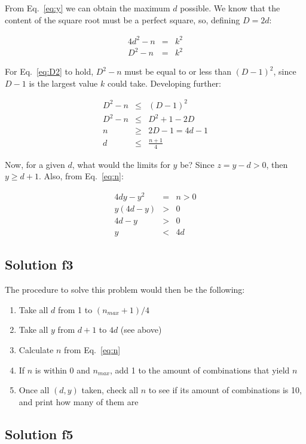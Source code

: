 \documentclass[english]{article}
\begin{document}
From Eq.~\ref{eq:y} we can obtain the maximum $d$ possible. We know that the content of the square root must be a perfect square, so, defining $D = 2d$:

\begin{eqnarray}
4d^2 - n & = & k^2 \\
D^2 - n & = & k^2 \label{eq:D2}
\end{eqnarray}

For Eq.~\ref{eq:D2} to hold, $D^2 - n$ must be equal to or less than $(D-1)^2$, since $D-1$ is the largest value $k$ could take. Developing further:

\begin{eqnarray}
D^2 - n & \leq & (D-1)^2 \\
D^2 - n & \leq & D^2 + 1 -2D \\
n & \geq & 2D-1 = 4d-1 \\
d & \leq & \frac{n+1}{4}
\end{eqnarray}

Now, for a given $d$, what would the limits for $y$ be? Since $z = y-d > 0$, then $y \geq d + 1$. Also, from Eq.~\ref{eq:n}:

\begin{eqnarray}
4 d y - y^2 & = & n > 0 \\
y(4d-y) & > & 0 \\
4d - y & > & 0 \\
y & < & 4d
\end{eqnarray}

\subsection{Solution f3}

The procedure to solve this problem would then be the following:

\begin{enumerate}
  \item Take all $d$ from 1 to $(n_{max}+1)/4$
  \item Take all $y$ from $d+1$ to $4d$ (see above)
  \item Calculate $n$ from Eq.~\ref{eq:n}
  \item If $n$ is within 0 and $n_{max}$, add 1 to the amount of combinations that yield $n$
  \item Once all $(d, y)$ taken, check all $n$ to see if its amount of combinations is 10, and print how many of them are
\end{enumerate}

\subsection{Solution f5}
\end{document}
